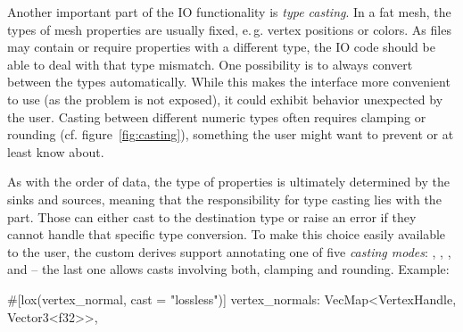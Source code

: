 \vfill

Another important part of the IO functionality is \emph{type casting}.
In a fat mesh, the types of mesh properties are usually fixed, e.\,g.  vertex positions or \code{[u8; 3]} colors.
As files may contain or require properties with a different type, the IO code should be able to deal with that type mismatch.
One possibility is to always convert between the types automatically.
While this makes the interface more convenient to use (as the problem is not exposed), it could exhibit behavior unexpected by the user.
Casting between different numeric types often requires clamping or rounding (cf. figure~\ref{fig:casting}), something the user might want to prevent or at least know about.

As with the order of data, the type of properties is ultimately determined by the  sinks and sources, meaning that the responsibility for type casting lies with the  part.
Those can either cast to the destination type or raise an error if they cannot handle that specific type conversion.
To make this choice easily available to the user, the custom derives support annotating one of five \emph{casting modes}: , , ,  and  -- the last one allows casts involving both, clamping and rounding.
Example:

\begin{rustcode}
#[lox(vertex_normal, cast = "lossless")]
vertex_normals: VecMap<VertexHandle, Vector3<f32>>,
\end{rustcode}

\newpage

